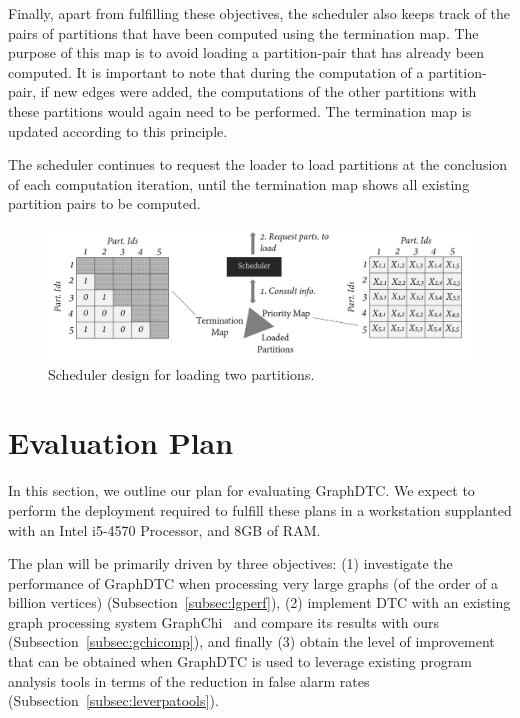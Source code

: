 \documentclass[10pt,preprint]{sigplanconf}
\begin{document}
Finally, apart from fulfilling these objectives, the scheduler also keeps track of the pairs of partitions that have been computed using the termination map. The purpose of this map is to avoid loading a partition-pair that has already been computed. It is important to note that during the computation of a partition-pair, if new edges were added, the computations of the other partitions with these partitions would again need to be performed. The termination map is updated according to this principle.

The scheduler continues to request the loader to load partitions at the conclusion of each computation iteration, until the termination map shows all existing partition pairs to be computed. 

\begin{figure}[!htbp]
	\begin{center}
		\includegraphics[scale=0.26]{Figures/scheddsgn.pdf}
	\end{center}
	\caption{Scheduler design for loading two partitions.}
	\label{fig-scheddsgn}
\end{figure}


\section{Evaluation Plan}
\label{sec:evpln}

In this section, we outline our plan for evaluating GraphDTC. We expect to perform the deployment required to fulfill these plans in a workstation supplanted with an Intel i5-4570 Processor, and 8GB of RAM.

The plan will be primarily driven by three objectives: (1) investigate the performance of GraphDTC when processing very large graphs (of the order of a billion vertices) (Subsection~\ref{subsec:lgperf}), (2) implement DTC with an existing graph processing system GraphChi~\cite{graphchi} and compare its results with ours (Subsection~\ref{subsec:gchicomp}), and finally (3) obtain the level of improvement that can be obtained when GraphDTC is used to leverage existing program analysis tools in terms of the reduction in false alarm rates (Subsection~\ref{subsec:leverpatools}). 
\end{document}
